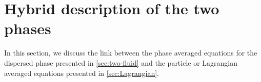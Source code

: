 \section{Hybrid description of the two phases}
\label{sec:averaged_eq}

In this section, %
we discuss the link between  the phase averaged equations for the dispersed phase presented in \ref{sec:two-fluid} and the particle or Lagrangian averaged equations presented in \ref{sec:Lagrangian}.




 



